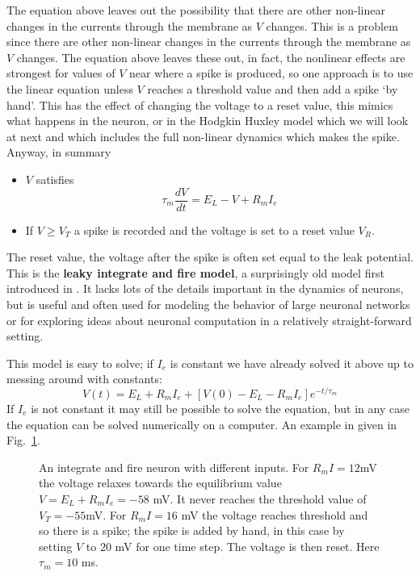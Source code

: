 \documentclass{article}
\begin{document}
The equation above leaves out the possibility that there are other
non-linear changes in the currents through the membrane as $V$
changes. This is a problem since there are other non-linear changes in
the currents through the membrane as $V$ changes. The equation above
leaves these out, in fact, the nonlinear effects are strongest for
values of $V$ near where a spike is produced, so one approach is to
use the linear equation unless $V$ reaches a threshold value and then
add a spike \lq{}by hand\rq{}. This has the effect of changing the
voltage to a reset value, this mimics what happens in the neuron, or
in the Hodgkin Huxley model which we will look at next and which
includes the full non-linear dynamics which makes the spike. Anyway,
in summary
\begin{itemize}
\item $V$ satisfies
\begin{equation}
\tau_m\frac{dV}{dt}=E_L-V+R_mI_e
\end{equation}
\item If $V\ge V_T$ a spike is recorded and the voltage is set to a
  reset value $V_R$.
\end{itemize}
The reset value, the voltage after the spike is often set equal to the
 leak potential. This is the \textbf{leaky integrate and fire model}, a surprisingly
old model first introduced in \cite{Lapicque1907a}. It lacks lots of
the details important in the dynamics of neurons, but is useful and
often used for modeling the behavior of large neuronal networks or for
exploring ideas about neuronal computation in a relatively
straight-forward setting.

This model is easy to solve; if $I_e$ is constant we have already
solved it above up to messing around with constants:
\begin{equation}
V(t)=E_L+R_mI_e+[V(0)-E_L-R_mI_e]e^{-t/\tau_m}
\end{equation}
If $I_e$ is not
constant it may still be possible to solve the equation, but in any
case the equation can be solved numerically on a computer. An example
in given in Fig.~\ref{v_i_f}.

\begin{figure}
\begin{center}

\end{center}
\caption{An integrate and fire neuron with different inputs. For
  $R_mI=12 $mV the voltage relaxes towards the equilibrium value
  $V=E_L+R_mI_e=-58$ mV. It never reaches the threshold value of
  $V_T=-55 $mV. For $R_mI=16$ mV the voltage reaches threshold and so
  there is a spike; the spike is added by hand, in this case by
  setting $V$ to $20$ mV for one time step. The voltage is then
  reset. Here $\tau_m=10$ ms.\label{v_i_f}}
\end{figure}
\end{document}
